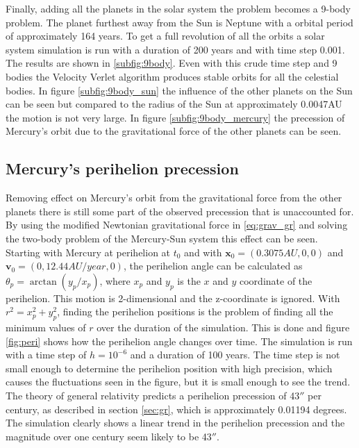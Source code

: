 \documentclass{article}
\begin{document}
Finally, adding all the planets in the solar system the problem becomes a 9-body problem. The planet furthest away from the Sun is Neptune with a orbital period of approximately 164 years. To get a full revolution of all the orbits a solar system simulation is run with a duration of 200 years and with time step 0.001. The results are shown in \ref{subfig:9body}. Even with this crude time step and 9 bodies the Velocity Verlet algorithm produces stable orbits for all the celestial bodies. In figure \ref{subfig:9body_sun} the influence of the other planets on the Sun can be seen but compared to the radius of the Sun at approximately 0.0047AU the motion is not very large. In figure \ref{subfig:9body_mercury} the precession of Mercury's orbit due to the gravitational force of the other planets can be seen.

\FloatBarrier
\subsection{Mercury's perihelion precession}

Removing effect on Mercury's orbit from the gravitational force from the other planets there is still some part of the observed precession that is unaccounted for. By using the modified Newtonian gravitational force in \ref{eq:grav_gr} and solving the two-body problem of the Mercury-Sun system this effect can be seen. Starting with Mercury at perihelion at $t_0$ and with $\bm{x}_0=(0.3075AU, 0, 0)$ and $\bm{v}_0=(0, 12.44AU/year, 0)$, the perihelion angle can be calculated as $\theta_p = \arctan{(y_p/x_p)}$, where $x_p$ and $y_p$ is the $x$ and $y$ coordinate of the perihelion. This motion is 2-dimensional and the z-coordinate is ignored. With $r^2 = x_p^2 + y_p^2$, finding the perihelion positions is the problem of finding all the minimum values of $r$ over the duration of the simulation. This is done and figure \ref{fig:peri} shows how the perihelion angle changes over time. The simulation is run with a time step of $h=10^{-6}$ and a duration of 100 years. The time step is not small enough to determine the perihelion position with high precision, which causes the fluctuations seen in the figure, but it is small enough to see the trend. The theory of general relativity predicts a perihelion precession of 43$''$ per century, as described in section \ref{sec:gr}, which is approximately 0.01194 degrees. The simulation clearly shows a linear trend in the perihelion precession and the magnitude over one century seem likely to be 43$''$. 
\end{document}
